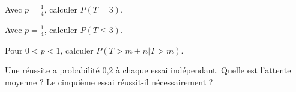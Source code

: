 \documentclass[11pt]{article}
\begin{document}
Avec \(p=\frac{1}{4}\), calculer \(P(T=3)\).\par
\vspace{5pt}
Avec \(p=\frac{1}{4}\), calculer \(P(T\leq 3)\).\par
\vspace{5pt}
Pour \(0<p<1\), calculer \(P(T>m+n|T>m)\).\par
\vspace{5pt}
Une réussite a probabilité 0,2 à chaque essai indépendant. Quelle est l’attente moyenne ? Le cinquième essai réussit-il nécessairement ?\par
\vspace{5pt}
\end{document}
